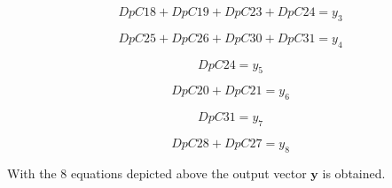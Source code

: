 \vspace{4mm}
\begin {equation}
    DpC18 + DpC19 + DpC23 + DpC24 = y_3
\end{equation}

\vspace{4mm}
\begin {equation}
    DpC25 + DpC26 + DpC30 + DpC31 = y_4
\end{equation}

\vspace{4mm}
\begin {equation}
    DpC24 = y_5
\end{equation}

\vspace{4mm}
\begin {equation}
    DpC20 + DpC21= y_6
\end{equation}

\vspace{4mm}
\begin {equation}
    DpC31 = y_7
\end{equation}

\vspace{4mm}
\begin {equation}
    DpC28 + DpC27 = y_8
\end{equation}


With the $8$ equations depicted above the output vector $\pmb{y}$ is obtained. 

